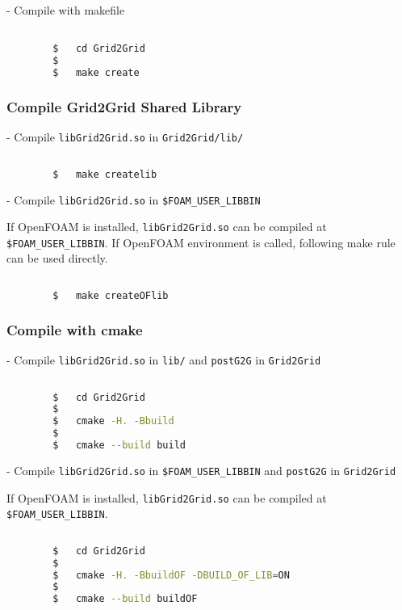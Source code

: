 		- Compile with makefile
		
		\begin{lstlisting}[language=bash]										

		$	cd Grid2Grid
		$
		$	make create
		\end{lstlisting}	
		
		\subsubsection{Compile Grid2Grid Shared Library}
		
		- Compile \texttt{libGrid2Grid.so} in \texttt{Grid2Grid/lib/}
		
		\begin{lstlisting}[language=bash]
		
		$	make createlib
		\end{lstlisting}		
	
		\vspace{0.2cm}

		- Compile \texttt{libGrid2Grid.so} in \texttt{\$FOAM\_USER\_LIBBIN}
		
		If OpenFOAM is installed, \texttt{libGrid2Grid.so} can be compiled at \texttt{\$FOAM\_USER\_LIBBIN}. If OpenFOAM environment is called, following make rule can be used directly. 
		
		\begin{lstlisting}[language=bash]
		
		$	make createOFlib
		\end{lstlisting}
		
		\subsubsection{Compile with cmake}
		
		\vspace{1em}		
		- Compile \texttt{libGrid2Grid.so} in \texttt{lib/} and \texttt{postG2G} in \texttt{Grid2Grid}
		
		\begin{lstlisting}[language=bash]										
		
		$	cd Grid2Grid
		$
		$	cmake -H. -Bbuild 
		$
		$	cmake --build build
		\end{lstlisting}		

		\vspace{1em}				
		- Compile \texttt{libGrid2Grid.so} in \texttt{\$FOAM\_USER\_LIBBIN} and \texttt{postG2G} in \texttt{Grid2Grid}		
		
		If OpenFOAM is installed, \texttt{libGrid2Grid.so} can be compiled at \texttt{\$FOAM\_USER\_LIBBIN}.
		
		\begin{lstlisting}[language=bash]	
		
		$	cd Grid2Grid
		$
		$	cmake -H. -BbuildOF -DBUILD_OF_LIB=ON
		$
		$	cmake --build buildOF
		\end{lstlisting}	
		